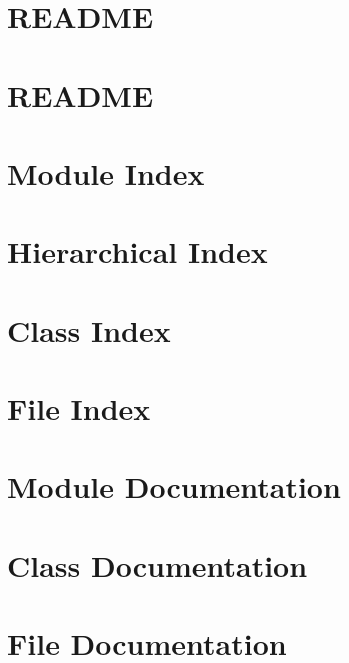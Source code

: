 \documentclass[twoside]{book}
\newcommand{\+}{\discretionary{\mbox{\scriptsize$\hookleftarrow$}}{}{}}
\newcommand{\clearemptydoublepage}{%
  \newpage{\pagestyle{empty}\cleardoublepage}%
}
\begin{document}
\chapter{R\+E\+A\+D\+ME}
\label{md_state_control__r_e_a_d_m_e}

\chapter{R\+E\+A\+D\+ME}
\label{md_test__r_e_a_d_m_e}

\chapter{Module Index}

\chapter{Hierarchical Index}

\chapter{Class Index}

\chapter{File Index}

\chapter{Module Documentation}







\chapter{Class Documentation}











\chapter{File Documentation}
















\backmatter
\newpage
{}
\clearemptydoublepage
{}
\printindex
\end{document}
